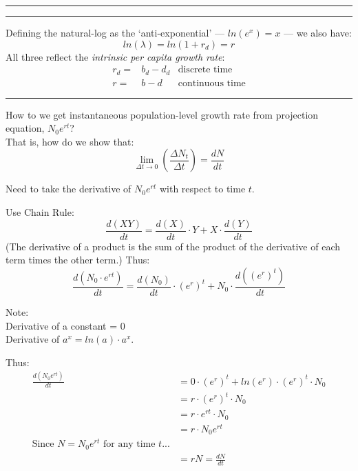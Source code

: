\documentclass{article}
\newcommand*\circled[1]{\tikz[baseline=(char.base)]{
            \node[shape=circle,draw,inner sep=2pt] (char) {#1};}}
\begin{document}
\rule[0.5ex]{\linewidth}{1pt}
\pagebreak

\rule[0.5ex]{\linewidth}{1pt}

Defining the natural-log as the `anti-exponential' --- $ln(e^x)=x$ --- we also have:
\begin{equation*}
	ln(\lambda)=ln(1+r_d)=r
\end{equation*}
All three reflect the \emph{intrinsic per capita growth rate}:
\begin{align*}
	r_d= & b_d-d_d &\text{discrete time}\\
	r=& b-d & \text{continuous time}
\end{align*}

\rule[0.5ex]{\linewidth}{1pt}

\circled{3}  How to we get instantaneous population-level growth rate from projection equation, $N_0 e^{rt}$?\\ That is, how do we show that:
\begin{equation*}
\lim_{\Delta t \to 0}\left(\frac{\Delta N_t}{\Delta t}\right) = \frac{dN}{dt}
\end{equation*}

Need to take the derivative of $N_0 e^{rt}$ with respect to time $t$.

Use Chain Rule:
\begin{equation*}
\frac{d(XY)}{dt}=\frac{d(X)}{dt}\cdot Y + X \cdot \frac{d(Y)}{dt}
\end{equation*}
(The derivative of a product is the sum of the product of the derivative of each term times the other term.)
Thus:
\begin{equation*}
\frac{d(N_0 \cdot e^{rt})}{dt}=\frac{d(N_0)}{dt}\cdot (e^r)^t + N_0 \cdot \frac{d((e^r)^t)}{dt}
\end{equation*}

Note:\\
Derivative of a constant = 0\\
Derivative of $a^x = ln(a)\cdot a^x$.

Thus:
\begin{align*}
	\frac{d(N_0 e ^{rt})}{dt} & =0 \cdot (e^r)^t + ln(e^r)\cdot (e^r)^t \cdot N_0\\
	&= r \cdot (e^r)^t \cdot N_0\\
	&= r \cdot e^{rt} \cdot N_0 \\
	&= r \cdot N_0 e^{rt} \\
\text{Since } N=N_0 e^{rt} \text{ for any time } t ...&\\
	&=rN=\frac{dN}{dt}
\end{align*}
\end{document}
